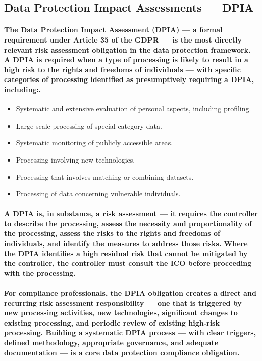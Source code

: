 \subsection{Data Protection Impact Assessments — DPIA}
\paragraph{The \textbf{Data Protection Impact Assessment (DPIA)} — a formal requirement under Article 35 of the GDPR — is the most directly relevant risk assessment obligation in the data protection framework. A DPIA is required when a type of processing is likely to result in a high risk to the rights and freedoms of individuals — with specific categories of processing identified as presumptively requiring a DPIA, including:.}
\begin{itemize}
    \item{Systematic and extensive evaluation of personal aspects, including profiling.}
    \item{Large-scale processing of special category data.}
    \item{Systematic monitoring of publicly accessible areas.}
    \item{Processing involving new technologies.}
    \item{Processing that involves matching or combining datasets.}
    \item{Processing of data concerning vulnerable individuals.}
\end{itemize}
\paragraph{A DPIA is, in substance, a risk assessment — it requires the controller to describe the processing, assess the necessity and proportionality of the processing, assess the risks to the rights and freedoms of individuals, and identify the measures to address those risks. Where the DPIA identifies a high residual risk that cannot be mitigated by the controller, the controller must consult the ICO before proceeding with the processing.}
\paragraph{For compliance professionals, the DPIA obligation creates a direct and recurring risk assessment responsibility — one that is triggered by new processing activities, new technologies, significant changes to existing processing, and periodic review of existing high-risk processing. Building a systematic DPIA process — with clear triggers, defined methodology, appropriate governance, and adequate documentation — is a core data protection compliance obligation.}


